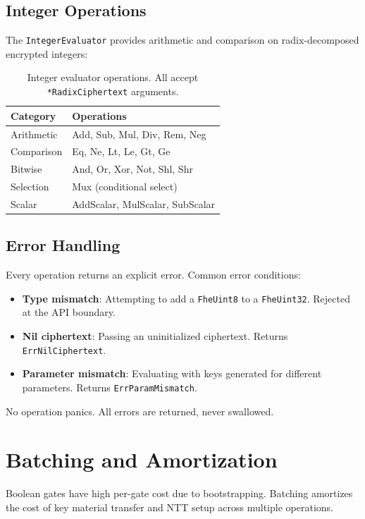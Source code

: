 \documentclass[11pt]{article}
\begin{document}
\subsection{Integer Operations}

The \texttt{IntegerEvaluator} provides arithmetic and comparison on radix-decomposed encrypted integers:

\begin{table}[h]
\centering
\begin{tabular}{@{}ll@{}}
\toprule
\textbf{Category} & \textbf{Operations} \\
\midrule
Arithmetic & Add, Sub, Mul, Div, Rem, Neg \\
Comparison & Eq, Ne, Lt, Le, Gt, Ge \\
Bitwise & And, Or, Xor, Not, Shl, Shr \\
Selection & Mux (conditional select) \\
Scalar & AddScalar, MulScalar, SubScalar \\
\bottomrule
\end{tabular}
\caption{Integer evaluator operations. All accept \texttt{*RadixCiphertext} arguments.}
\label{tab:int-ops}
\end{table}

\subsection{Error Handling}

Every operation returns an explicit error. Common error conditions:

\begin{itemize}
\item \textbf{Type mismatch}: Attempting to add a \texttt{FheUint8} to a \texttt{FheUint32}. Rejected at the API boundary.
\item \textbf{Nil ciphertext}: Passing an uninitialized ciphertext. Returns \texttt{ErrNilCiphertext}.
\item \textbf{Parameter mismatch}: Evaluating with keys generated for different parameters. Returns \texttt{ErrParamMismatch}.
\end{itemize}

No operation panics. All errors are returned, never swallowed.

\section{Batching and Amortization}

Boolean gates have high per-gate cost due to bootstrapping. Batching amortizes the cost of key material transfer and NTT setup across multiple operations.
\end{document}

